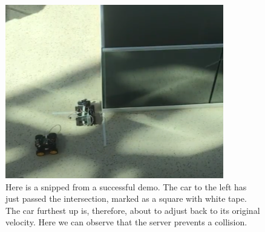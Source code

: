 \begin{figure}[h!]
	\centering
	\includegraphics[width=1\linewidth]{figures/succsess_demo}
	\caption[Successful demo]{Here is a snipped from a successful demo. The car to the left has just passed the intersection, marked as a square with white tape. The car furthest up is, therefore, about to adjust back to its original velocity. Here we can observe that the server prevents a collision.}
	\label{fig:successdemo}
\end{figure}